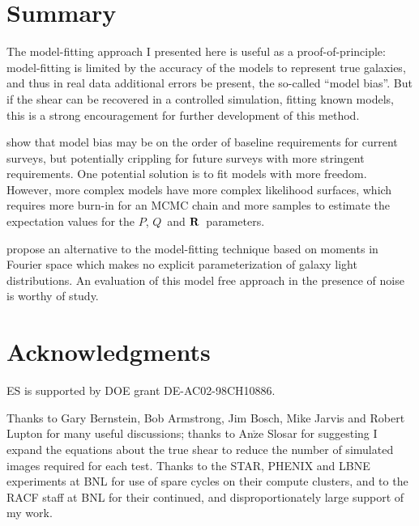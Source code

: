 \documentclass[12pt,preprint]{aastex}
\newcommand{\vecQ}{\mbox{\boldmath $Q$}}
\newcommand{\matR}{\mbox{$\bf R$}}
\begin{document}
\section{Summary} \label{sec:summary}

The model-fitting approach I presented here is useful as a proof-of-principle:
model-fitting is limited by the accuracy of the models to represent true
galaxies, and thus in real data additional errors be present, the so-called
``model bias''.  But if the shear can be recovered in a controlled simulation,
fitting known models, this is a strong encouragement for further development of
this method.

\cite{Kacprzak13} show that model bias may be on the order of baseline
requirements for current surveys, but potentially crippling for future surveys
with more stringent requirements. One potential solution is to fit models with
more freedom.  However, more complex models have more complex likelihood
surfaces, which requires more burn-in for an MCMC chain and more samples to
estimate the expectation values for the $P$, \vecQ\ and \matR\ parameters.

\cite{ba14} propose an alternative to the model-fitting technique based on
moments in Fourier space which makes no explicit parameterization of galaxy
light distributions.  An evaluation of this model free approach in the presence
of noise is worthy of study.

\section*{Acknowledgments}

ES is supported by DOE grant DE-AC02-98CH10886.

Thanks to Gary Bernstein, Bob Armstrong, Jim Bosch, Mike Jarvis and Robert
Lupton for many useful discussions; thanks to An$\check{\textrm{z}}$e Slosar for
suggesting I expand the equations about the true shear to reduce the number of
simulated images required for each test.  Thanks to the STAR, PHENIX and LBNE
experiments at BNL for use of spare cycles on their compute clusters, and to
the RACF staff at BNL for their continued, and disproportionately large support
of my work.




\end{document}

